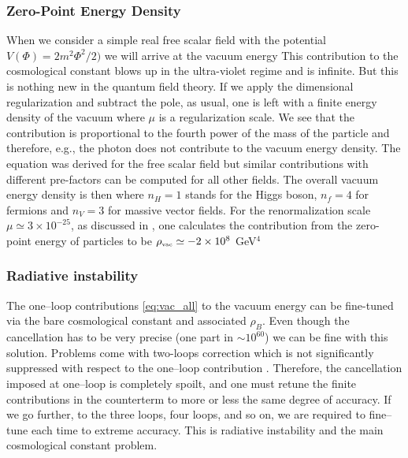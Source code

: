 \subsubsection{Zero-Point Energy Density}
When we consider a simple real free scalar field with the potential $V(\Phi)=2m^2\Phi^2/2)$ we will arrive at the vacuum energy
This contribution to the cosmological constant blows up in the ultra-violet regime and is infinite. But this is nothing new in the quantum field theory. If we apply the dimensional regularization \parencite{tHooft:1972tcz} and subtract the pole, as usual, one is left with a finite energy density of the vacuum
where $\mu$ is a regularization scale. We see that the contribution is proportional to the fourth power of the mass of the particle and therefore, e.g., the photon does not contribute to the vacuum energy density. The equation was derived for the free scalar field but similar contributions with different pre-factors can be computed for all other fields. The overall vacuum energy density is then
where $n_H=1$ stands for the Higgs boson, $n_f=4$ for fermions and $n_V=3$ for massive vector fields. For the renormalization scale $\mu\simeq3\times10^{-25}$, as discussed in \textcite{2011arXiv1105.6296K}, one calculates the contribution from the zero-point energy of particles to be  $\rho_\text{\tiny vac}\simeq-2\times10^8$ GeV$^4$
\subsubsection{Radiative instability}
The one--loop contributions \eqref{eq:vac_all} to the vacuum energy can be fine-tuned via the bare cosmological constant and associated $\rho_B$. Even though the cancellation has to be very precise (one part in $\sim10^{60}$) we can be fine with this solution. Problems come with two-loops correction which is not significantly suppressed with respect to the one--loop contribution \parencite{2012CRPhy..13..566M}. Therefore, the cancellation imposed at one--loop is completely spoilt, and one must retune the finite contributions in the counterterm to more or less the same degree of accuracy. If we go further, to the three loops, four loops, and so on, we are required to fine--tune each time to extreme accuracy. This is radiative instability and the main cosmological constant problem.

